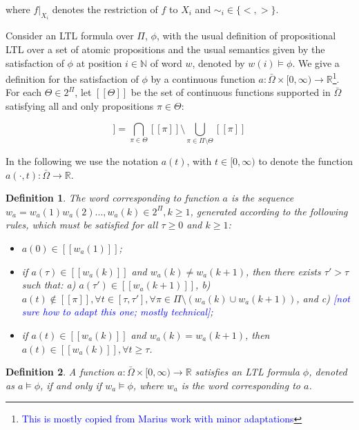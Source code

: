 \documentclass{article}
\newtheorem{definition}{Definition}
\newcommand*{\R}{\mathbb{R}}
\newcommand*{\N}{\mathbb{N}}
\newcommand*{\psat}[1]{[[#1]]}
\newcommand*{\fran}[1]{\textcolor{blue}{#1}}
\begin{document}
where $\left.f\right|_{X_i}$ denotes the restriction of $f$ to $X_i$ and $\sim_i
\in \{<, >\}$.

Consider an LTL formula over $\Pi$, $\phi$, with the usual definition of
propositional LTL over a set of atomic propositions and the usual semantics
given by the satisfaction of $\phi$ at position $i \in \N$ of word $w$, denoted
by $w(i) \models \phi$. We give a definition for the satisfaction of $\phi$ by a
continuous function $a : \bar \Omega \times [0, \infty) \rightarrow
\R$\footnote{\fran{This is mostly copied from Marius work with minor
adaptations}}. For each $\Theta \in 2^\Pi$, let $\psat{\Theta}$ be the set of
continuous functions supported in $\bar\Omega$ satisfying all and only
propositions $\pi \in \Theta$:

\begin{equation}
    \psat{\Theta} = \bigcap_{\pi \in \Theta} \psat{\pi} \setminus 
    \bigcup_{\pi \in \Pi \setminus \Theta} \psat{\pi}
\end{equation}

In the following we use the notation $a(t)$, with $t \in [0, \infty)$ to denote
the function $a(\cdot , t) : \bar\Omega \rightarrow \R$.

\begin{definition}\label{def:word}
    The word corresponding to function $a$ is the sequence $w_a = w_a(1)
    w_a(2)..., w_a(k) \in 2^\Pi, k \geq 1$, generated according to the following
    rules, which must be satisfied for all $\tau \geq 0$ and $k \geq 1$:

    \begin{itemize}
        \item $a(0) \in \psat{w_a(1)}$;
        \item if $a(\tau) \in \psat{w_a(k)}$ and $w_a(k) \neq w_a(k + 1)$, then
            there exists $\tau' > \tau$ such that: a) $a(\tau') \in \psat{w_a(k
            + 1)}$, b) $a(t) \notin \psat{\pi}, \forall t \in [\tau, \tau'], \forall \pi \in
            \Pi \setminus (w_a(k) \cup w_a(k + 1))$, and c) \fran{[not sure how
            to adapt this one; mostly technical]};
        \item if $a(t) \in \psat{w_a(k)}$ and $w_a(k) = w_a(k + 1)$, then $a(t) \in
        \psat{w_a(k)}, \forall t \geq \tau$.
    \end{itemize}
\end{definition}

\begin{definition}\label{def:sat}
    A function $a : \bar \Omega \times [0, \infty) \rightarrow \R$ satisfies an
        LTL formula $\phi$, denoted as $a \models \phi$, if and only if $w_a
        \models \phi$, where $w_a$ is the word corresponding to $a$.
\end{definition}
\end{document}
